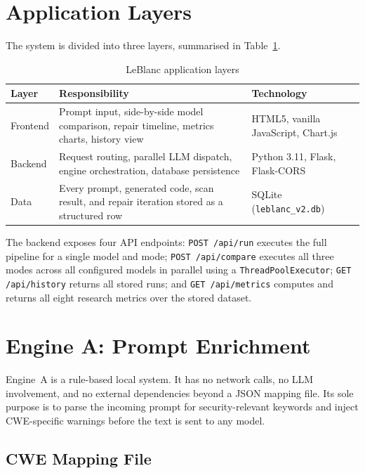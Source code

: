 \documentclass[12pt,a4paper]{report}
\begin{document}
\section{Application Layers}
\label{sec:layers}

The system is divided into three layers, summarised in Table~\ref{tab:layers}.

\begin{table}[H]
\centering
\caption{LeBlanc application layers}
\label{tab:layers}
\renewcommand{\arraystretch}{1.3}
\begin{tabularx}{\textwidth}{@{}lXl@{}}
\toprule
\textbf{Layer} & \textbf{Responsibility} & \textbf{Technology} \\
\midrule
Frontend   & Prompt input, side-by-side model comparison, repair
             timeline, metrics charts, history view
           & HTML5, vanilla JavaScript, Chart.js \\
Backend    & Request routing, parallel LLM dispatch, engine
             orchestration, database persistence
           & Python 3.11, Flask, Flask-CORS \\
Data       & Every prompt, generated code, scan result, and
             repair iteration stored as a structured row
           & SQLite (\texttt{leblanc\_v2.db}) \\
\bottomrule
\end{tabularx}
\end{table}

The backend exposes four API endpoints: \texttt{POST /api/run} executes the full
pipeline for a single model and mode; \texttt{POST /api/compare} executes all
three modes across all configured models in parallel using a
\texttt{ThreadPoolExecutor}; \texttt{GET /api/history} returns all stored runs;
and \texttt{GET /api/metrics} computes and returns all eight research metrics
over the stored dataset.

\section{Engine A: Prompt Enrichment}
\label{sec:enginea}

Engine~A is a rule-based local system. It has no network calls, no LLM
involvement, and no external dependencies beyond a JSON mapping file. Its sole
purpose is to parse the incoming prompt for security-relevant keywords and inject
CWE-specific warnings before the text is sent to any model.

\subsection{CWE Mapping File}
\label{ssec:cwemapping}
\end{document}
